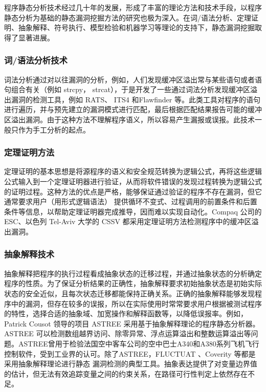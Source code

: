 程序静态分析技术经过几十年的发展，形成了丰富的理论方法和技术手段，以程序静态分析为基础的静态漏洞挖掘方法的研究也极为深入。在词/语法分析、定理证明、抽象解释、符号执行、模型检验和机器学习等理论的支持下，静态漏洞挖掘取得了显著进展。

\subsubsection{词/语法分析技术}

词法分析通过对以往漏洞的分析，例如，人们发现缓冲区溢出常与某些语句或者语句组合有关（例如 strcpy， strcat），于是开发了一些通过词法分析发现缓冲区溢出漏洞的检测工具，例如 RATS、 ITS4 和Flawfinder 等。此类工具对程序的语句进行遍历，并与预先建立的漏洞模式进行匹配，最后根据匹配结果报告可能的缓冲区溢出漏洞。由于这种方法不理解程序语义，所以容易产生漏报或误报。此技术一般只作为手工分析的起点。

\subsubsection{定理证明方法}

定理证明的基本思想是将源程序的语义和安全规范转换为逻辑公式，再将这些逻辑公式输入到一个定理证明器进行验证，从而将软件错误的发现过程转换为逻辑公式的证明过程。这种方法的优点是严格，能够保证通过验证的程序不存在漏洞，但它通常要求用户（用形式逻辑语法） 提供循环不变式、过程调用的前置条件和后置条件等信息，以帮助定理证明器完成推导，因而难以实现自动化。Compaq 公司的 ESC、以色列 Tel-Aviv 大学的 CSSV 都采用定理证明方法检测程序中的缓冲区溢出漏洞。

\subsubsection{抽象解释技术}

抽象解释把程序的执行过程看成抽象状态的迁移过程，并通过抽象状态的分析确定程序的性质。为了保证分析结果的正确性，抽象解释要求初始抽象状态是初始实际状态的安全近似，且每次状态迁移都能保持正确关系。正确的抽象解释能够发现程序中的漏洞，但存在较多的误报，所以在实际使用时常常要求用户根据被测试程序的特性，选择合适的抽象域、加宽操作和解释函数等，以降低误报率。例如， Patrick Cousot 领导的项目 ASTREE 采用基于抽象解释理论的程序静态分析器。ASTREE 可以检测数组越界访问、除零异常、浮点运算溢出和整数运算溢出等问题。ASTREE曾用于检验法国空中客车公司的空中巴士A340和A380系列飞机飞行控制软件，受到工业界的认可。除了ASTREE，FLUCTUAT 、Coverity 等都是采用抽象解释理论进行静态
漏洞检测的典型工具。抽象表达提供了对变量边界值的估计，但无法有效追踪变量之间的约束关系，在路径可行性判定上依然存在不足。

